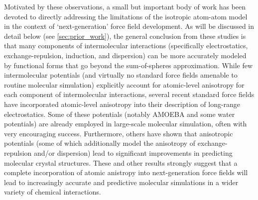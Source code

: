 Motivated by these observations,
a small but important  body of work has been
devoted to directly addressing the limitations of the isotropic atom-atom
model in the context of `next-generation' force field development. As will be discussed in
detail below (see \cref{sec:prior_work}), the general conclusion from these
studies is that many components of intermolecular interactions
(specifically electrostatics, exchange-repulsion, induction, and
dispersion)
can be more accurately modeled by functional forms that go beyond the
sum-of-spheres approximation.
\cite{Price2000,Hagler2015,Ren2003}
While few intermolecular potentials (and virtually no standard force fields
amenable to routine molecular simulation) explicitly account for atomic-level anisotropy
for each component of intermolecular interactions, several recent standard force fields
have incorporated atomic-level anisotropy into their description of 
long-range electrostatics.\cite{Cardamone2014} Some of these potentials
(notably AMOEBA\cite{Ponder2010,Ren2003,Shi2013} and some water
potentials\cite{Cisneros2016a,Cardamone2014}) 
are already employed in large-scale molecular simulation, often with very
encouraging success.\cite{Cardamone2014}
Furthermore, others have shown that anisotropic potentials (some of which additionally
model the anisotropy of exchange-repulsion
and/or dispersion) lead to significant improvements in predicting 
molecular crystal structures.
\cite{Cardamone2014,Price2010a,Day1999,Day2003,Price2008,Misquitta2016,Misquitta2008a}
These and other results strongly 
suggest that a complete incorporation of atomic anistropy into next-generation
force fields
will lead to increasingly accurate and
predictive molecular simulations in a wider variety of chemical interactions.
\cite{Hagler2015}

